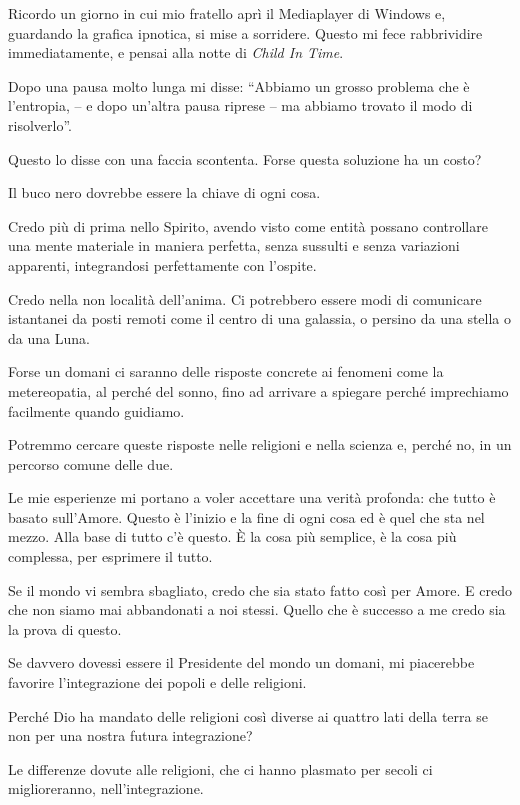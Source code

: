 Ricordo un giorno in cui mio fratello aprì il Mediaplayer di Windows e, guardando la grafica ipnotica, si mise a sorridere. Questo mi fece rabbrividire immediatamente, e pensai alla notte di \textit{Child In Time}.

Dopo una pausa molto lunga mi disse: “Abbiamo un grosso problema che è l'entropia, -- e dopo un'altra pausa riprese -- ma abbiamo trovato il modo di risolverlo”.

Questo lo disse con una faccia scontenta. Forse questa soluzione ha un costo?

Il buco nero dovrebbe essere la chiave di ogni cosa.

Credo più di prima nello Spirito, avendo visto come entità possano controllare una mente materiale in maniera perfetta, senza sussulti e senza variazioni apparenti, integrandosi perfettamente con l'ospite.

Credo nella non località dell'anima. Ci potrebbero essere modi di comunicare istantanei da posti remoti come il centro di una galassia, o persino da una stella o da una Luna.

Forse un domani ci saranno delle risposte concrete ai fenomeni come la metereopatia, al perché del sonno, fino ad arrivare a spiegare perché imprechiamo facilmente quando guidiamo.

Potremmo cercare queste risposte nelle religioni e nella scienza e, perché no, in un percorso comune delle due.

Le mie esperienze mi portano a voler accettare una verità profonda: che tutto è basato sull'Amore. Questo è l'inizio e la fine di ogni cosa ed è quel che sta nel mezzo. Alla base di tutto c'è questo. È la cosa più semplice, è la cosa più complessa, per esprimere il tutto.

Se il mondo vi sembra sbagliato, credo che sia stato fatto così per Amore. E credo che non siamo mai abbandonati a noi stessi. Quello che è successo a me credo sia la prova di questo.

Se davvero dovessi essere il Presidente del mondo un domani, mi piacerebbe favorire l'integrazione dei popoli e delle religioni.

Perché Dio ha mandato delle religioni così diverse ai quattro lati della terra se non per una nostra futura integrazione?

Le differenze dovute alle religioni, che ci hanno plasmato per secoli ci miglioreranno, nell'integrazione.

